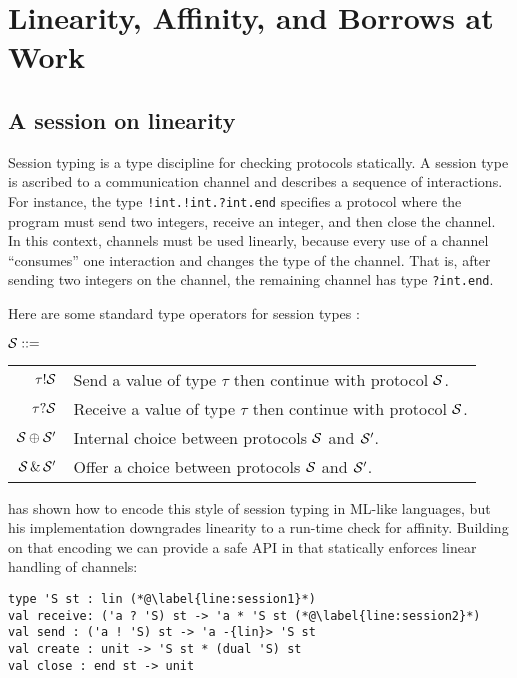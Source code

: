 \section{Linearity, Affinity, and Borrows at Work}


\subsection{A session on linearity}
\label{sec:session-linearity}

Session typing \cite{Honda1993,DBLP:conf/esop/HondaVK98} is a type
discipline for checking protocols statically. A session type is
ascribed to a communication channel and describes
a sequence of interactions. For instance, the type
\lstinline{!int.!int.?int.end} specifies a protocol
where the program must send two integers, receive an integer, and then
close the channel. 
%
In this context, channels must be used linearly, because every use of
a channel ``consumes'' one interaction and  changes the type of the
channel. That is, after sending two integers on the channel,
the remaining channel has type \lstinline{?int.end}.

Here are some standard type operators for session types \SType:
\begin{center}
  $\mathcal S ::=$
  \begin{tabular}[t]{rl}
    $\tau ! \mathcal S$ & Send a value of type $\tau$ then continue with protocol $\mathcal S$.\\
    $\tau ? \mathcal S$& Receive a value of type $\tau$ then continue with protocol $\mathcal S$.\\
    $\mathcal S \oplus \mathcal S'$& Internal choice between protocols $\mathcal S$ and $\mathcal S'$.\\
    $\mathcal S \operatorname{\&} \mathcal S'$
                    & Offer a choice between protocols $\mathcal S$ and $\mathcal S'$. 
  \end{tabular}
\end{center}

\citet{DBLP:journals/jfp/Padovani17}  has shown how to encode this
style of session typing in ML-like languages, but his implementation
downgrades linearity to a run-time check for affinity. Building on that
encoding we can provide a safe API in \lang that statically enforces
linear handling of channels:
%
\begin{lstlisting}
type 'S st : lin (*@\label{line:session1}*)
val receive: ('a ? 'S) st -> 'a * 'S st (*@\label{line:session2}*)
val send : ('a ! 'S) st -> 'a -{lin}> 'S st
val create : unit -> 'S st * (dual 'S) st
val close : end st -> unit
\end{lstlisting}

